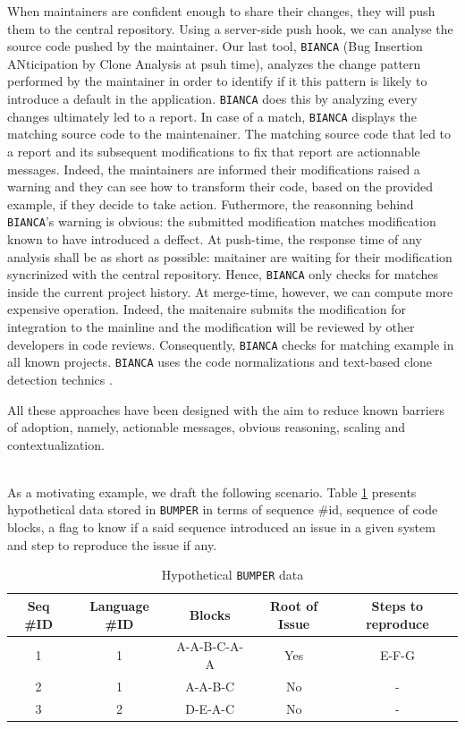 When maintainers are confident enough to share their changes, they will push them to the central repository.
Using a server-side push hook, we can analyse the source code pushed by the maintainer.
Our last tool, {\tt BIANCA} (Bug Insertion ANticipation by Clone Analysis at psuh time), analyzes the change pattern performed by the maintainer in order to identify if it this pattern is likely to introduce a default in the application.
{\tt BIANCA} does this by analyzing every changes ultimately led to a report.
In case of a match, {\tt BIANCA} displays the matching source code to the maintenainer.
The matching source code that led to a report and its subsequent modifications to fix that report are actionnable messages.
Indeed, the maintainers are informed their modifications raised a warning and they can see how to transform their code, based on the provided example, if they decide to take action.
Futhermore, the reasonning behind {\tt BIANCA}'s warning is obvious: the submitted modification matches modification known to have introduced a deffect.
At push-time, the response time of any analysis shall be as short as possible: maitainer are waiting for their modification syncrinized with the central repository.
Hence, {\tt BIANCA} only checks for matches inside the current project history.
At merge-time, however, we can compute more expensive operation.
Indeed, the maitenaire submits the modification for integration to the mainline and the modification will be reviewed by other developers in code reviews.
Consequently, {\tt BIANCA} checks for matching example in all known projects.
{\tt BIANCA} uses the code normalizations and text-based clone detection technics \cite{Cordy2006,ROY2009,Cordy2011}.

All these approaches have been designed with the aim to reduce known barriers of adoption, namely, actionable messages, obvious reasoning, scaling and contextualization\cite{Johnson2013, Hovemeyer2004, Lopez2011, Lewis2013}.

\\

As a motivating example, we draft the following scenario. Table \ref{tab:bumper-hypo} presents hypothetical data stored in {\tt BUMPER} in terms of sequence \#id, sequence of code blocks, a flag to know if a said sequence introduced an issue in a given system and step to reproduce the issue if any.

\begin{table}[h!]
\centering
\begin{tabular}{c|c|c|c|c}
Seq \#ID & Language \#ID & Blocks & Root of Issue & Steps to reproduce \\ \hline \hline
1        & 1             & A-A-B-C-A-A   & Yes  & E-F-G         \\
2        & 1             & A-A-B-C       & No   & -         \\
3        & 2             & D-E-A-C       & No &  - \\ \hline \hline
\end{tabular}
\caption{Hypothetical {\tt BUMPER} data}
\label{tab:bumper-hypo}
\end{table}

